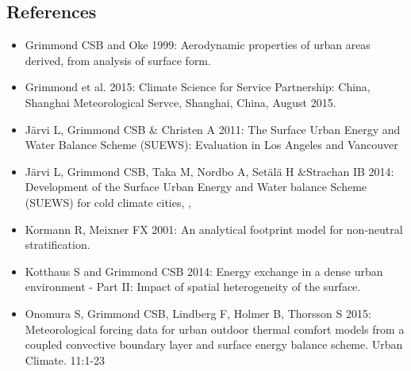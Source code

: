\documentclass[letterpaper,10pt,english]{sphinxmanual}
\begin{document}
\subsection{References}
\label{\detokenize{Tutorials/SuewsAdvanced:references}}\begin{itemize}
\item {} 
Grimmond CSB and Oke 1999: Aerodynamic properties of urban areas
derived, from analysis of surface form. 

\item {} 
Grimmond et al. 2015: Climate Science for Service Partnership: China,
Shanghai Meteorological Servce, Shanghai, China, August 2015.

\item {} 
Järvi L, Grimmond CSB \& Christen A 2011: The Surface Urban Energy and
Water Balance Scheme (SUEWS): Evaluation in Los Angeles and Vancouver

\item {} 
Järvi L, Grimmond CSB, Taka M, Nordbo A, Setälä H \&Strachan IB 2014:
Development of the Surface Urban Energy and Water balance Scheme
(SUEWS) for cold climate cities, , 

\item {} 
Kormann R, Meixner FX 2001: An analytical footprint model for
non-neutral stratification. 

\item {} 
Kotthaus S and Grimmond CSB 2014: Energy exchange in a dense urban
environment - Part II: Impact of spatial heterogeneity of the
surface. 

\item {} 
Onomura S, Grimmond CSB, Lindberg F, Holmer B, Thorsson S 2015:
Meteorological forcing data for urban outdoor thermal comfort models
from a coupled convective boundary layer and surface energy balance
scheme. Urban Climate. 11:1-23 


\end{itemize}
\end{document}
